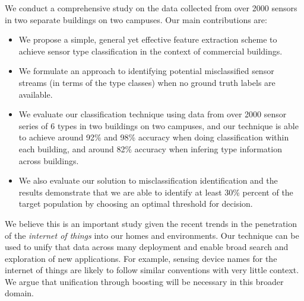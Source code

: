 We conduct a comprehensive study on the data collected from over 2000 sensors in two separate buildings on two campuses. Our main contributions are:

\begin{itemize}
\item We propose a simple, general yet effective feature extraction scheme to achieve sensor type classification in the context of commercial buildings.
\item We formulate an approach to identifying potential misclassified sensor streams (in terms of the type classes) when no ground truth labels are available.
\item We evaluate our classification technique using data from over 2000 sensor series of 6 types in two buildings on two campuses, and our technique is able to achieve around 92\% and 98\% accuracy when doing classification within each building, and around 82\% accuracy when infering type information across buildings.
\item We also evaluate our solution to misclassification identification and the results demonstrate that we are able to identify at least 30\% percent of the target population by choosing an optimal threshold for decision.
\end{itemize}


We believe this is an important study given the recent trends in the penetration
of the \emph{internet of things} into our homes and environments.
Our technique can be used to unify that data across many deployment and enable broad search 
and exploration of new applications.  For example, sensing device names for 
the internet of things are likely to follow similar conventions with very little 
context.  We argue that unification through boosting will be necessary in this broader domain.




 






